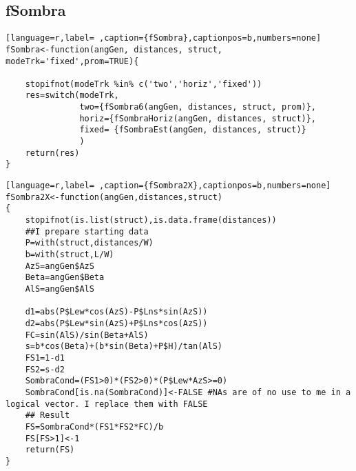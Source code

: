 \subsection{fSombra}
\label{sec:org7a8e022}
\label{subsec:fsombra}
\begin{lstlisting}[language=r,label= ,caption={fSombra},captionpos=b,numbers=none]
fSombra<-function(angGen, distances, struct, modeTrk='fixed',prom=TRUE){

    stopifnot(modeTrk %in% c('two','horiz','fixed'))
    res=switch(modeTrk, 
               two={fSombra6(angGen, distances, struct, prom)},
               horiz={fSombraHoriz(angGen, distances, struct)},
               fixed= {fSombraEst(angGen, distances, struct)}
               )
    return(res)
}
\end{lstlisting}
\begin{lstlisting}[language=r,label= ,caption={fSombra2X},captionpos=b,numbers=none]
fSombra2X<-function(angGen,distances,struct)
{
    stopifnot(is.list(struct),is.data.frame(distances))
    ##I prepare starting data	
    P=with(struct,distances/W)
    b=with(struct,L/W)
    AzS=angGen$AzS
    Beta=angGen$Beta
    AlS=angGen$AlS

    d1=abs(P$Lew*cos(AzS)-P$Lns*sin(AzS))
    d2=abs(P$Lew*sin(AzS)+P$Lns*cos(AzS))
    FC=sin(AlS)/sin(Beta+AlS)
    s=b*cos(Beta)+(b*sin(Beta)+P$H)/tan(AlS)
    FS1=1-d1
    FS2=s-d2
    SombraCond=(FS1>0)*(FS2>0)*(P$Lew*AzS>=0)
    SombraCond[is.na(SombraCond)]<-FALSE #NAs are of no use to me in a logical vector. I replace them with FALSE
    ## Result
    FS=SombraCond*(FS1*FS2*FC)/b
    FS[FS>1]<-1
    return(FS)
}	
\end{lstlisting}
